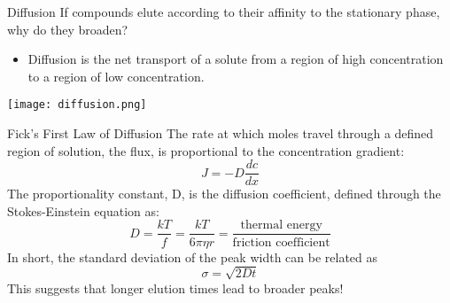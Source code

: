 \documentclass[11pt,letterpaper]{article}
\begin{document}

\begin{frame}{Diffusion}
	If compounds elute according to their affinity to the
	stationary phase, why do they broaden?
	\begin{itemize}
		\item \alert{Diffusion} is the net transport of a solute from a
			region of high concentration to a region of low
			concentration.
	\end{itemize}

	\begin{center}
		\texttt{[image: diffusion.png]}
	\end{center}
\end{frame}


\begin{frame}{Fick's First Law of Diffusion}
		The rate at which moles travel through a defined region of
			solution, the \alert{flux}, is proportional to the
			concentration gradient:
			\begin{equation*}
				J = -D \frac{dc}{dx}
			\end{equation*}
		The proportionality constant, D, is the \alert{diffusion
			coefficient}, defined through the Stokes-Einstein
			equation as:
			\begin{equation*}
				D = \frac{kT}{f} = \frac{kT}{6\pi\eta r} =
				\frac{\text{thermal energy}}{\text{friction
				coefficient}}
			\end{equation*}
		In short, the standard deviation of the peak width can be
			related as
			\begin{equation*}
				\sigma = \sqrt{2Dt}
			\end{equation*}
			This suggests that longer elution times lead to broader
			peaks!
\end{frame}

\end{document}
